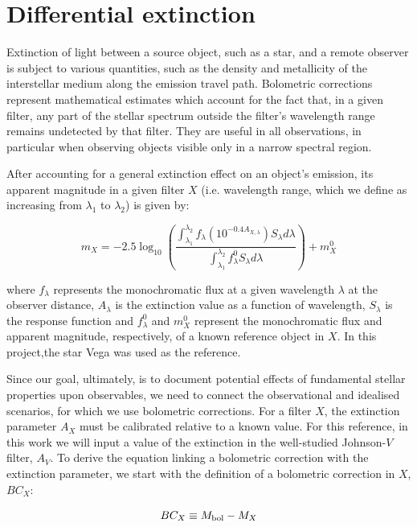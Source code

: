 \documentclass[12pt, a4paper]{report}
\begin{document}
\section{Differential extinction}
Extinction of light between a source object, such as a star, and a remote observer is subject to various quantities, such as the density and metallicity of the interstellar medium along the emission travel path. Bolometric corrections represent mathematical estimates which account for the fact that, in a given filter, any part of the stellar spectrum outside the filter's wavelength range remains undetected by that filter. They are useful in all observations, in particular when observing objects visible only in a narrow spectral region.

After accounting for a general extinction effect on an object's emission, its apparent magnitude in a given filter $X$ (i.e. wavelength range, which we define as increasing from $\lambda _{1}$ to $\lambda _{2}$) is given by:

\begin{equation}
m_{X} = -2.5 \log_{10} \left(\frac{ \int_{\lambda_{1}}^{\lambda_{2}} f_{\lambda} \left( 10^{-0.4 A_{X,\lambda}} \right) S_{\lambda} d\lambda }{ \int_{\lambda_{1}}^{\lambda_{2}} f_{\lambda}^{0} S_{\lambda} d\lambda }\right) + m_{X}^{0}
\label{app_mag_def}
\end{equation}

where $f_{\lambda}$ represents the monochromatic flux at a given wavelength $\lambda$ at the observer distance, $A_{\lambda}$ is the extinction value as a function of wavelength, $S_{\lambda}$ is the response function and $f_{\lambda}^{0}$ and $m_{X}^{0}$ represent the monochromatic flux and apparent magnitude, respectively, of a known reference object in $X$. In this project,the star Vega was used as the reference.

Since our goal, ultimately, is to document potential effects of fundamental stellar properties upon observables, we need to connect the observational and idealised scenarios, for which we use bolometric corrections. For a filter $X$, the extinction parameter $A_{X}$ must be calibrated relative to a known value. For this reference, in this work we will input a value of the extinction in the well-studied Johnson-$V$ filter, $A_{V}$.
To derive the equation linking a bolometric correction with the extinction parameter, we start with the definition of a bolometric correction in $X$, $BC_{X}$:

\begin{equation}
BC_{X} \equiv M_{\textnormal{bol}} - M_{X}
\label{BC_def}
\end{equation}
\end{document}
